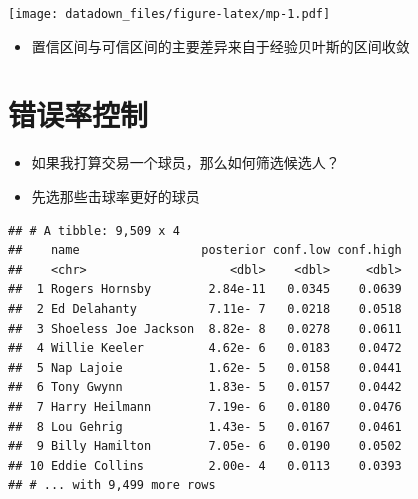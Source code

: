 \documentclass[]{book}
\newenvironment{Shaded}{\begin{snugshade}}{\end{snugshade}}
\newcommand{\CommentTok}[1]{\textcolor[rgb]{0.56,0.35,0.01}{\textit{#1}}}
\newcommand{\KeywordTok}[1]{\textcolor[rgb]{0.13,0.29,0.53}{\textbf{#1}}}
\newcommand{\NormalTok}[1]{#1}
\newcommand{\OperatorTok}[1]{\textcolor[rgb]{0.81,0.36,0.00}{\textbf{#1}}}
\newcommand{\StringTok}[1]{\textcolor[rgb]{0.31,0.60,0.02}{#1}}
\providecommand{\tightlist}{%
  \setlength{\itemsep}{0pt}\setlength{\parskip}{0pt}}
\begin{document}
\texttt{[image: datadown\_files/figure-latex/mp-1.pdf]}

\begin{itemize}
\tightlist
\item
  置信区间与可信区间的主要差异来自于经验贝叶斯的区间收敛
\end{itemize}

\section{错误率控制}

\begin{itemize}
\item
  如果我打算交易一个球员，那么如何筛选候选人？
\item
  先选那些击球率更好的球员
\end{itemize}

\begin{Shaded}
\end{Shaded}

\begin{verbatim}
## # A tibble: 9,509 x 4
##    name                 posterior conf.low conf.high
##    <chr>                    <dbl>    <dbl>     <dbl>
##  1 Rogers Hornsby        2.84e-11   0.0345    0.0639
##  2 Ed Delahanty          7.11e- 7   0.0218    0.0518
##  3 Shoeless Joe Jackson  8.82e- 8   0.0278    0.0611
##  4 Willie Keeler         4.62e- 6   0.0183    0.0472
##  5 Nap Lajoie            1.62e- 5   0.0158    0.0441
##  6 Tony Gwynn            1.83e- 5   0.0157    0.0442
##  7 Harry Heilmann        7.19e- 6   0.0180    0.0476
##  8 Lou Gehrig            1.43e- 5   0.0167    0.0461
##  9 Billy Hamilton        7.05e- 6   0.0190    0.0502
## 10 Eddie Collins         2.00e- 4   0.0113    0.0393
## # ... with 9,499 more rows
\end{verbatim}
\end{document}
